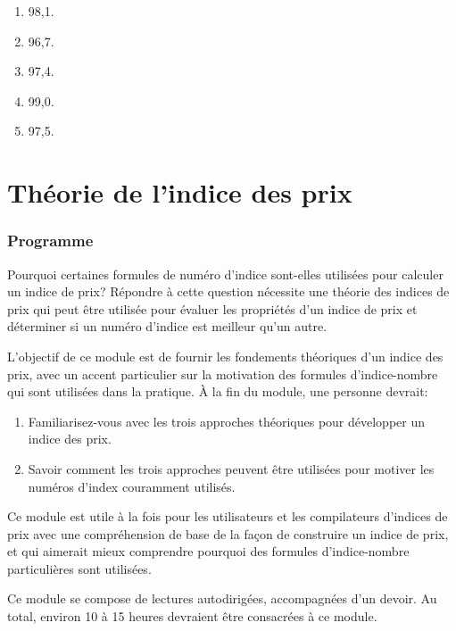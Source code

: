 \documentclass[]{article}
\begin{document}
\begin{enumerate}
\def\labelenumi{\alph{enumi})}
\item
  98,1.
\item
  96,7.
\item
  97,4.
\item
  99,0.
\item
  97,5.
\end{enumerate}

\hypertarget{part-thuxe9orie-de-lindice-des-prix}{%
\part{Théorie de l'indice des prix}\label{part-thuxe9orie-de-lindice-des-prix}}

\hypertarget{programme-1}{%
\section{Programme}\label{programme-1}}

Pourquoi certaines formules de numéro d'indice sont-elles utilisées pour calculer un indice de prix? Répondre à cette question nécessite une théorie des indices de prix qui peut être utilisée pour évaluer les propriétés d'un indice de prix et déterminer si un numéro d'indice est meilleur qu'un autre.

L'objectif de ce module est de fournir les fondements théoriques d'un indice des prix, avec un accent particulier sur la motivation des formules d'indice-nombre qui sont utilisées dans la pratique. À la fin du module, une personne devrait:

\begin{enumerate}
\def\labelenumi{\arabic{enumi}.}
\item
  Familiarisez-vous avec les trois approches théoriques pour développer un indice des prix.
\item
  Savoir comment les trois approches peuvent être utilisées pour motiver les numéros d'index couramment utilisés.
\end{enumerate}

Ce module est utile à la fois pour les utilisateurs et les compilateurs d'indices de prix avec une compréhension de base de la façon de construire un indice de prix, et qui aimerait mieux comprendre pourquoi des formules d'indice-nombre particulières sont utilisées.

Ce module se compose de lectures autodirigées, accompagnées d'un devoir. Au total, environ 10 à 15 heures devraient être consacrées à ce module.
\end{document}
